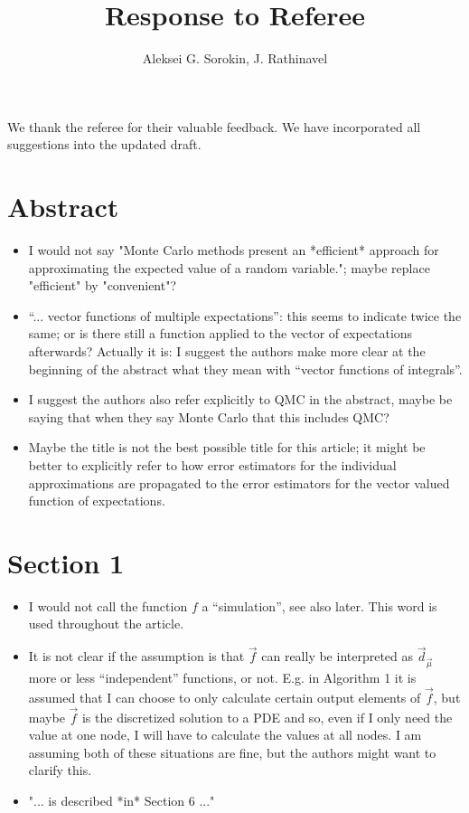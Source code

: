 \documentclass{article}[12pt]
\title{Response to Referee}
\author{Aleksei G. Sorokin, J. Rathinavel}
\date{}
\newcommand{\Referee}[1]{{\color{blue} #1}}
\begin{document}
\maketitle    

We thank the referee for their valuable  feedback. We have incorporated all suggestions into the updated draft. 

\section{Abstract}

\begin{itemize}
    \item \Referee{I would not say "Monte Carlo methods present an *efficient* approach for
  approximating the expected value of a random variable."; maybe replace
  "efficient" by "convenient"?}
    \item \Referee{``... vector functions of multiple expectations'': this seems to indicate twice the same; or is there still a function applied to the vector of expectations afterwards? Actually it is: I suggest the authors make more clear at the beginning of the abstract what they mean with ``vector functions of integrals''.}
    \item \Referee{I suggest the authors also refer explicitly to QMC in the abstract, maybe be saying that when they say Monte Carlo that this includes QMC?}
    \item \Referee{Maybe the title is not the best possible title for this article; it might be better to explicitly refer to how error estimators for the individual approximations are propagated to the error estimators for the vector valued function of expectations.}
\end{itemize}

\section{Section 1}

\begin{itemize}
    \item \Referee{I would not call the function $f$ a ``simulation'', see also later. This word is used throughout the article.}
    \item \Referee{It is not clear if the assumption is that $\vec{f}$ can really be interpreted as $\vec{d}_{\vec{\mu}}$ more or less ``independent'' functions, or not. E.g. in Algorithm 1 it is assumed that I can choose to only calculate certain output elements of $\vec{f}$, but maybe $\vec{f}$ is the discretized solution to a PDE and so, even if I only need the value at one node, I will have to calculate the values at all nodes. I am assuming both of these situations are fine, but the authors might want to clarify this.}
    \item \Referee{"... is described *in* Section 6 ..."}
\end{itemize}
\end{document}
